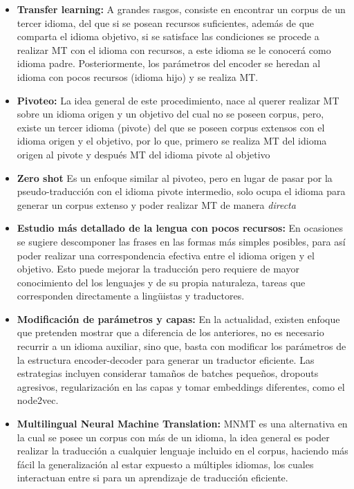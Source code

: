 \documentclass[12pt,twocolumn, letterpaper]{article}
\begin{document}
\begin{itemize}
\item \textbf{Transfer learning:} A grandes rasgos, consiste en encontrar un corpus de un tercer idioma, del que si se posean recursos suficientes, además de que comparta el idioma objetivo, si se satisface las condiciones se procede a realizar MT con el idioma con recursos, a este idioma se le conocerá como idioma padre. Posteriormente, los parámetros del encoder se heredan al idioma con pocos recursos (idioma hijo) y se realiza MT.
\item \textbf{Pivoteo:} La idea general de este procedimiento, nace al querer realizar MT sobre un idioma origen y un objetivo del cual no se poseen corpus, pero, existe un tercer idioma (pivote) del que se poseen corpus extensos con el idioma origen y el objetivo, por lo que, primero se realiza MT del idioma origen al pivote y después MT del idioma pivote al objetivo
\item \textbf{Zero shot} Es un enfoque similar al pivoteo, pero en lugar de pasar por la pseudo-traducción con el idioma pivote intermedio, solo ocupa el idioma para generar un corpus extenso y poder realizar MT de manera \emph{directa}
\item \textbf{Estudio más detallado de la lengua con pocos recursos:} En ocasiones se sugiere descomponer las frases en las formas más simples posibles, para así poder realizar una correspondencia efectiva entre el idioma origen y el objetivo. Esto puede mejorar la traducción pero requiere de mayor conocimiento del los lenguajes y de su propia naturaleza, tareas que corresponden directamente a lingüistas y traductores. 
\item \textbf{Modificación de parámetros y capas:} En la actualidad, existen enfoque que pretenden mostrar que a diferencia de los anteriores, no es necesario recurrir a un idioma auxiliar, sino que, basta con modificar los parámetros de la estructura encoder-decoder para generar un traductor eficiente. Las estrategias incluyen considerar tamaños de batches pequeños, dropouts agresivos, regularización en las capas y tomar embeddings diferentes, como el node2vec.
\item \textbf{Multilingual Neural Machine Translation:} MNMT es una alternativa en la cual se posee un corpus con más de un idioma, la idea general es poder realizar la traducción a cualquier lenguaje incluido en el corpus, haciendo más fácil la generalización al estar expuesto a múltiples idiomas, los cuales interactuan entre si para un aprendizaje de traducción eficiente.
\end{itemize}
\end{document}
